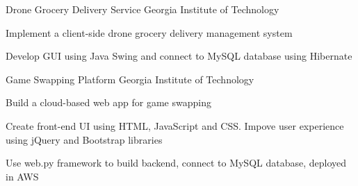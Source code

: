 


\begin{cventries}


\compactcventry
{Drone Grocery Delivery Service}
{Georgia Institute of Technology} %
{
\begin{cvitems}
	\item{Implement a client-side drone grocery delivery management system}
	\item{Develop GUI using Java Swing and connect to MySQL database using Hibernate}	
\end{cvitems}
}



\compactcventry
{Game Swapping Platform}
{Georgia Institute of Technology} %
{
\begin{cvitems}
	\item{Build a cloud-based web app for game swapping}
	\item{Create front-end UI using HTML, JavaScript and CSS. Impove user experience using jQuery and Bootstrap libraries}
	\item{Use web.py framework to build backend, connect to MySQL database, deployed in AWS}
\end{cvitems}
}



\end{cventries}